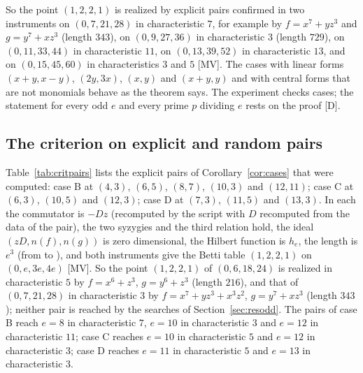 \documentclass[11pt]{article}
\theoremstyle{definition}
\theoremstyle{remark}
\newcommand{\F}{\mathbb{F}}
\begin{document}
\begin{table}[htbp]
\centering\footnotesize

\caption{The pairs of Theorem~\ref{thm:central} that were computed: the case ($T$: $A=x^e$, $B=y^e$; $G$: central forms that are not monomials), $(e,p)$, the forms over $\F_p$, the scalar $\lambda$ with $gf-fg=\lambda z^e$, the length of $U/(Uf+Ug)$ and whether the Betti table is $(1,2,2,1)$ on $(0,e,3e,4e)$ in both instruments; the length is $e^3$ in every case.}
\label{tab:central}
\end{table}

So the point $(1,2,2,1)$ is realized by explicit pairs confirmed in two instruments on $(0,7,21,28)$ in characteristic $7$, for example by $f=x^7+yz^3$ and $g=y^7+xz^3$ (length $343$), on $(0,9,27,36)$ in characteristic $3$ (length $729$), on $(0,11,33,44)$ in characteristic $11$, on $(0,13,39,52)$ in characteristic $13$, and on $(0,15,45,60)$ in characteristics $3$ and $5$ [MV]. The cases with linear forms $(x+y,x-y)$, $(2y,3x)$, $(x,y)$ and $(x+y,y)$ and with central forms that are not monomials behave as the theorem says. The experiment checks cases; the statement for every odd $e$ and every prime $p$ dividing $e$ rests on the proof [D].

\subsection{The criterion on explicit and random pairs}
\label{sec:rescrit}

Table~\ref{tab:critpairs} lists the \ncritXCases{} explicit pairs of Corollary~\ref{cor:cases} that were computed: case B at $(4,3)$, $(6,5)$, $(8,7)$, $(10,3)$ and $(12,11)$; case C at $(6,3)$, $(10,5)$ and $(12,3)$; case D at $(7,3)$, $(11,5)$ and $(13,3)$. In each the commutator is $-Dz$ (recomputed by the script with $D$ recomputed from the data of the pair), the two syzygies and the third relation hold, the ideal $(zD,n(f),n(g))$ is zero dimensional, the Hilbert function is $h_e$, the length is $e^3$ (from \ncritMinLength{} to \ncritMaxLength{}), and both instruments give the Betti table $(1,2,2,1)$ on $(0,e,3e,4e)$ [MV]. So the point $(1,2,2,1)$ of $(0,6,18,24)$ is realized in characteristic $5$ by $f=x^6+z^3$, $g=y^6+z^3$ (length $216$), and that of $(0,7,21,28)$ in characteristic $3$ by $f=x^7+yz^3+x^3z^2$, $g=y^7+xz^3$ (length $343$); neither pair is reached by the searches of Section~\ref{sec:resodd}. The pairs of case B reach $e=8$ in characteristic $7$, $e=10$ in characteristic $3$ and $e=12$ in characteristic $11$; case C reaches $e=10$ in characteristic $5$ and $e=12$ in characteristic $3$; case D reaches $e=11$ in characteristic $5$ and $e=13$ in characteristic $3$.
\end{document}
